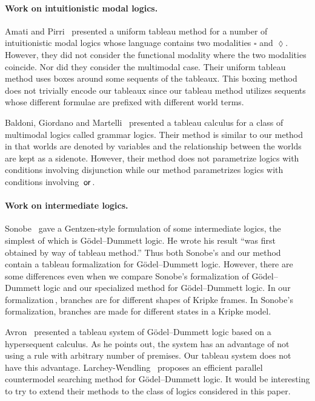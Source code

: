     \paragraph{Work on intuitionistic modal logics.}

    Amati and Pirri~\cite{amati94} presented a uniform tableau method for a number of
    intuitionistic modal logics whose language contains two modalities
    $\square$ and $\lozenge$.
    However, they did not consider the functional modality where the two
    modalities coincide.  Nor did they consider the multimodal case.
    Their uniform tableau method uses boxes around some sequents of the
    tableaux.  This boxing method does not trivially encode our tableaux since our
    tableau method utilizes sequents whose different formulae are prefixed
    with different world terms.

    Baldoni, Giordano and Martelli~\cite{baldoni98} presented a tableau
    calculus for a class of multimodal logics called grammar logics.
    Their method is similar to our method in that worlds are denoted by
    variables and the relationship between the worlds are kept as a
    sidenote.
    However, their method does not parametrize logics with conditions involving
    disjunction while our method parametrizes logics with conditions
    involving $\,\mathbin{\mathsf{or}}\,$.

    \paragraph{Work on intermediate logics.}

    Sonobe~\cite{sonobe} gave a Gentzen-style formulation of some
    intermediate logics, the simplest of which is G\"{o}del--Dummett logic.
    He wrote his result ``was first obtained by way of tableau method.''
    Thus both Sonobe's and our method contain a tableau formalization for
    G\"{o}del--Dummett logic.  However, there are some differences even when
    we compare Sonobe's formalization of G\"odel--Dummett logic and our
    specialized method for G\"odel--Dummett logic.
    In our formalization\,\LB, branches are for different shapes of Kripke
    frames.  In Sonobe's formalization, branches are made for different
    states in a Kripke model.

    Avron~\cite{avron2000} presented a tableau system of G\"odel--Dummett logic
    based on a hypersequent calculus.
    As he points out, the system has an advantage of not using a rule with
    arbitrary number of
    premises.  Our tableau system does not have this advantage.
    Larchey-Wendling~\cite{countermodelsearch} proposes an efficient parallel
    countermodel searching method for G\"odel--Dummett logic.
    It would be interesting to try to extend their methods to the
    class of logics considered in this paper.

